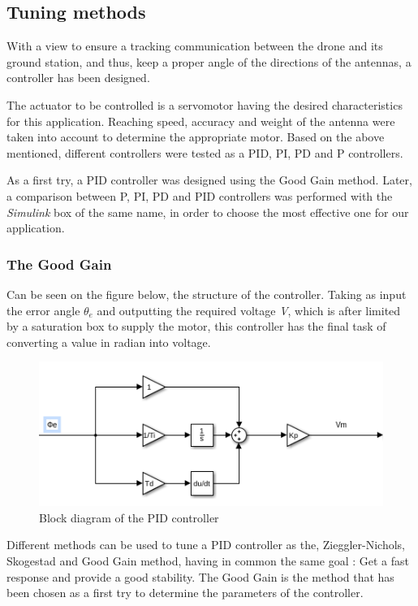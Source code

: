 \subsection{Tuning methods}
With a view to ensure a tracking communication between the drone and its ground station, and thus, keep a proper angle of the directions of the antennas, a controller has been designed.\par

The actuator to be controlled is a servomotor having the desired characteristics for this application.  Reaching speed, accuracy and weight of the antenna were taken into account to determine the appropriate motor. Based on the above mentioned, different controllers were tested as a PID, PI, PD and P controllers.\par 	
As a first try, a PID controller was designed using the Good Gain method. Later, a comparison between P, PI, PD and PID controllers was performed with the \emph{Simulink} box of the same name, in order to choose the most effective one for our application.\par 	

\subsubsection{The Good Gain}


Can be seen on the figure below, the structure of the controller. Taking as input the error angle \textbf{$\theta_{e}$} and outputting the required voltage \textit{V}, which is after limited by a saturation box to supply the motor, this controller has the final task of converting a value in radian into voltage.\par

\begin{figure}[H]
  \centering
  \includegraphics[scale=0.5]{figures/PID_2D.png}
  \caption[LABEL] {Block diagram of the PID controller}
\end{figure}
  
Different methods can be used to tune a PID controller as the, Zieggler-Nichols, Skogestad and Good Gain method, having in common the same goal : Get a fast response and provide a good stability. The Good Gain is the method that has been chosen as a first try to determine the parameters of the controller.\par
  

